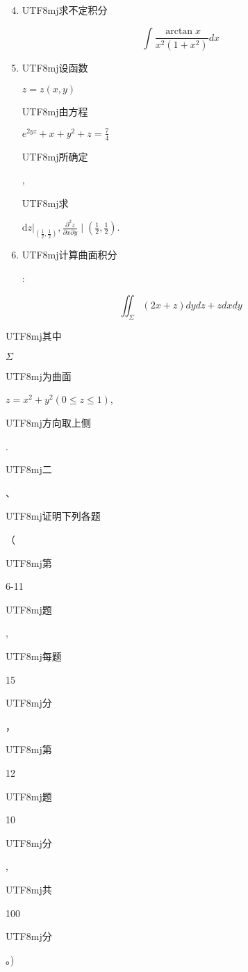 \documentclass[10pt]{article}
\begin{document}
\begin{enumerate}
  \setcounter{enumi}{3}
  \item \begin{CJK}{UTF8}{mj}求不定积分\end{CJK}
\end{enumerate}
$$
\int \frac{\arctan x}{x^{2}\left(1+x^{2}\right)} d x
$$

\begin{enumerate}
  \setcounter{enumi}{4}
  \item \begin{CJK}{UTF8}{mj}设函数\end{CJK} $z=z(x, y)$ \begin{CJK}{UTF8}{mj}由方程\end{CJK} $e^{2 y z}+x+y^{2}+z=\frac{7}{4}$ \begin{CJK}{UTF8}{mj}所确定\end{CJK}, \begin{CJK}{UTF8}{mj}求\end{CJK} $\left.\mathrm{d} z\right|_{\left(\frac{1}{2}, \frac{1}{2}\right)}, \frac{\partial^{2} z}{\partial x \partial y} \mid\left(\frac{1}{2}, \frac{1}{2}\right)$.

  \item \begin{CJK}{UTF8}{mj}计算曲面积分\end{CJK}:

\end{enumerate}
$$
\iint_{\Sigma}(2 x+z) d y d z+z d x d y
$$
\begin{CJK}{UTF8}{mj}其中\end{CJK} $\Sigma$ \begin{CJK}{UTF8}{mj}为曲面\end{CJK} $z=x^{2}+y^{2}(0 \leq z \leq 1)$, \begin{CJK}{UTF8}{mj}方向取上侧\end{CJK}.

\begin{CJK}{UTF8}{mj}二\end{CJK}、\begin{CJK}{UTF8}{mj}证明下列各题\end{CJK}（\begin{CJK}{UTF8}{mj}第\end{CJK} 6-11 \begin{CJK}{UTF8}{mj}题\end{CJK}, \begin{CJK}{UTF8}{mj}每题\end{CJK} 15 \begin{CJK}{UTF8}{mj}分\end{CJK}， \begin{CJK}{UTF8}{mj}第\end{CJK} 12 \begin{CJK}{UTF8}{mj}题\end{CJK} 10 \begin{CJK}{UTF8}{mj}分\end{CJK}, \begin{CJK}{UTF8}{mj}共\end{CJK} 100 \begin{CJK}{UTF8}{mj}分\end{CJK}。)
\end{document}
